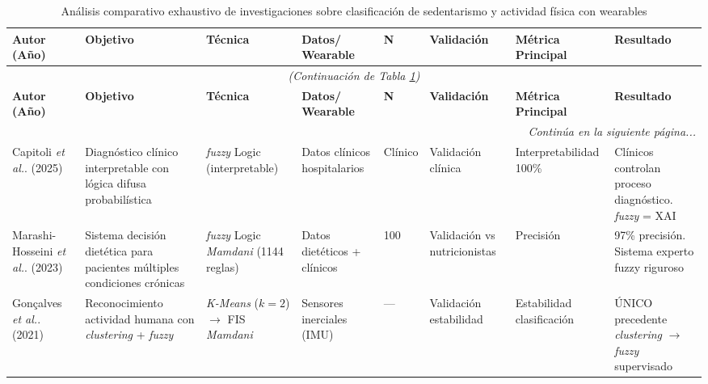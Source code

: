 \begin{landscape}
\footnotesize
\begin{longtable}{@{}p{1.8cm}p{2.5cm}p{1.8cm}p{1.5cm}p{0.9cm}p{1.3cm}p{2.0cm}p{1.8cm}@{}}
\caption{Análisis comparativo exhaustivo de investigaciones sobre clasificación de sedentarismo y actividad física con wearables}
\label{tab:comparativa_investigaciones_completa} \\
\toprule
\textbf{Autor (Año)} & 
\textbf{Objetivo} & 
\textbf{Técnica} & 
\textbf{Datos/ Wearable} & 
\textbf{N} & 
\textbf{Validación} & 
\textbf{Métrica Principal} & 
\textbf{Resultado} \\
\midrule
\endfirsthead

\multicolumn{8}{c}{\textit{(Continuación de Tabla \ref{tab:comparativa_investigaciones_completa})}} \\
\toprule
\textbf{Autor (Año)} & 
\textbf{Objetivo} & 
\textbf{Técnica} & 
\textbf{Datos/ Wearable} & 
\textbf{N} & 
\textbf{Validación} & 
\textbf{Métrica Principal} & 
\textbf{Resultado} \\
\midrule
\endhead

\midrule
\multicolumn{8}{r}{\textit{Continúa en la siguiente página...}} \\
\endfoot

\bottomrule
\endlastfoot


Capitoli \textit{et al.}. (2025) \cite{Capitoli2025FuzzyXAI} & 
Diagnóstico clínico interpretable con lógica difusa probabilística & 
\textit{fuzzy} Logic (interpretable) & 
Datos clínicos hospitalarios & 
Clínico & 
Validación clínica & 
Interpretabilidad 100\% & 
Clínicos controlan proceso diagnóstico. \textit{fuzzy} = XAI \\

\midrule

Marashi-Hosseini \textit{et al.}. (2023) \cite{MarashiHosseini2023Dietary} & 
Sistema decisión dietética para pacientes múltiples condiciones crónicas & 
\textit{fuzzy} Logic \textit{Mamdani} (1144 reglas) & 
Datos dietéticos + clínicos & 
100 & 
Validación vs nutricionistas & 
Precisión & 
97\% precisión. Sistema experto fuzzy riguroso \\

\midrule

Gonçalves \textit{et al.}. (2021) \cite{Goncalves2021} & 
Reconocimiento actividad humana con \textit{clustering} + \textit{fuzzy} & 
\textit{K-Means} ($k=2$) $\rightarrow$ FIS \textit{Mamdani} & 
Sensores inerciales (IMU) & 
--- & 
Validación estabilidad & 
Estabilidad clasificación & 
ÚNICO precedente \textit{clustering} $\rightarrow$ \textit{fuzzy} supervisado \\


\end{longtable}
\end{landscape}
